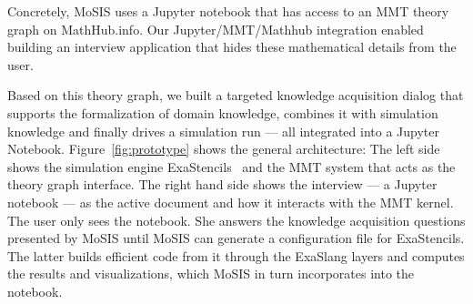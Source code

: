 Concretely, MoSIS uses a Jupyter notebook that has access to an MMT theory graph on MathHub.info.  Our Jupyter/MMT/Mathhub integration enabled building an interview application that hides these mathematical details from the user.

Based on this theory graph, we built a targeted knowledge acquisition dialog that supports the formalization of domain knowledge, combines it with simulation knowledge and finally drives a simulation run --- all integrated into a Jupyter Notebook.
Figure~\ref{fig:prototype} shows the general architecture:
The left side shows the simulation engine \textsf{ExaStencils}~\cite{exastencils.on} and the MMT system that acts as the theory graph interface.
The right hand side shows the interview --- a Jupyter notebook --- as the active document and how it interacts with the MMT kernel.
The user only sees the notebook.
She answers the knowledge acquisition questions presented by MoSIS until MoSIS can generate a configuration file for ExaStencils.
The latter builds efficient code from it through the ExaSlang layers and computes the results and visualizations, which MoSIS in turn incorporates into the notebook. 


